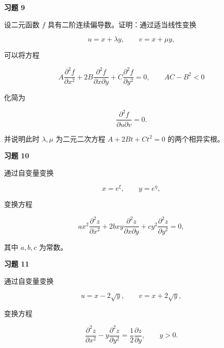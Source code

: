 \begin{exercisebox}
\textbf{习题 9}

设二元函数 \(f\) 具有二阶连续偏导数。证明：通过适当线性变换

\[
        u=x+\lambda y,\qquad v=x+\mu y,
      \]

可以将方程

\[
        A\frac{\partial^2 f}{\partial x^2}
        +
        2B\frac{\partial^2 f}{\partial x\partial y}
        +
        C\frac{\partial^2 f}{\partial y^2}=0,\qquad AC-B^2<0
      \]

化简为

\[
        \frac{\partial^2 f}{\partial u\partial v}=0.
      \]

并说明此时 \(\lambda,\mu\) 为二元二次方程 \(A+2Bt+Ct^2=0\) 的两个相异实根。
\end{exercisebox}

\begin{exercisebox}
\textbf{习题 10}

通过自变量变换

\[
        x=e^\xi,\qquad y=e^\eta,
      \]

变换方程

\[
        ax^2\frac{\partial^2 z}{\partial x^2}
        +
        2bxy\frac{\partial^2 z}{\partial x\partial y}
        +
        cy^2\frac{\partial^2 z}{\partial y^2}=0,
      \]

其中 \(a,b,c\) 为常数。
\end{exercisebox}

\begin{exercisebox}
\textbf{习题 11}

通过自变量变换

\[
        u=x-2\sqrt y,\qquad v=x+2\sqrt y,
      \]

变换方程

\[
        \frac{\partial^2 z}{\partial x^2}
        -
        y\frac{\partial^2 z}{\partial y^2}
        =
        \frac12\frac{\partial z}{\partial y},\qquad y>0.
      \]
\end{exercisebox}

